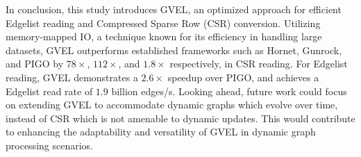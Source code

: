 In conclusion, this study introduces GVEL, an optimized approach for efficient Edgelist reading and Compressed Sparse Row (CSR) conversion. Utilizing memory-mapped IO, a technique known for its efficiency in handling large datasets, GVEL outperforms established frameworks such as Hornet, Gunrock, and PIGO by $78\times$, $112\times$, and $1.8\times$ respectively, in CSR reading. For Edgelist reading, GVEL demonstrates a $2.6\times$ speedup over PIGO, and achieves a Edgelist read rate of $1.9$ billion edges/s. Looking ahead, future work could focus on extending GVEL to accommodate dynamic graphs which evolve over time, instead of CSR which is not amenable to dynamic updates. This would contribute to enhancing the adaptability and versatility of GVEL in dynamic graph processing scenarios.
